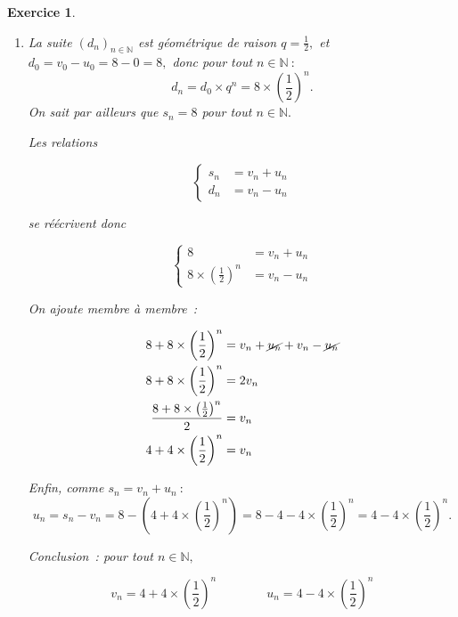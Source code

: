 \documentclass[10pt]{article}
\newtheorem{exo}{Exercice}
\begin{document}
\begin{exo}
\begin{enumerate}
\begin{itemize}
\medskip

Conclusion~: pour tout $n\in\mathbb{N},$ $d_{n+1}=\frac{1}{2}d_n$ donc $\left(d_n\right)_{n\in\mathbb{N}}$ est géométrique de raison $q=\frac{1}{2}.$
\end{itemize}
\item  La suite $(d_n)_{n\in\mathbb{N}}$ est géométrique de raison $q=\frac{1}{2},$ et  $d_0=v_0-u_0=8-0=8,$ donc pour tout $n\in\mathbb{N}~:$
\[d_n=d_0\times q^n=8\times \left(\frac{1}{2}\right)^n.\] On sait par ailleurs que $s_n=8$ pour tout $n\in\mathbb{N}.$

\medskip
Les relations

\[\begin{cases}
s_n&=v_n+u_n\\
d_n&=v_n-u_n\end{cases}\]

se réécrivent donc

\[\begin{cases}
8&=v_n+u_n\\
8\times \left(\frac{1}{2}\right)^n&=v_n-u_n\end{cases}\]

On ajoute membre à membre~:

\begin{align*}
8+8\times \left(\frac{1}{2}\right)^n&=v_n+\cancel{u_n}+v_n-\cancel{u_n}\\
8+8\times \left(\frac{1}{2}\right)^n&=2v_n\\
\frac{8+8\times \left(\frac{1}{2}\right)^n}{2}&=v_n\\
4+4\times \left(\frac{1}{2}\right)^n&=v_n
\end{align*}

\medskip

Enfin, comme $s_n=v_n+u_n~:$
\[u_n=s_n-v_n=8-\left(4+4\times \left(\frac{1}{2}\right)^n\right)=8-4-4\times \left(\frac{1}{2}\right)^n=4-4\times \left(\frac{1}{2}\right)^n.\]

\medskip

Conclusion~: pour tout $n\in\mathbb{N},$

\[\boxed{v_n=4+4\times \left(\frac{1}{2}\right)^n}\qquad\qquad \boxed{u_n=4-4\times \left(\frac{1}{2}\right)^n}\]




\end{enumerate}


\end{exo}
\end{document}
